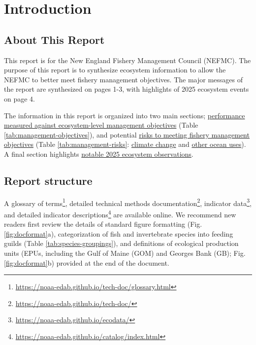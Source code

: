 \documentclass[
  10pt,
]{article}
\author{}
\date{\vspace{-2.5em}}
\begin{document}
\setcounter{page}{6}
\thispagestyle{fancy}

\section{Introduction}\label{introduction}

\subsection{About This Report}\label{about-this-report}

This report is for the New England Fishery Management Council (NEFMC). The purpose of this report is to synthesize ecosystem information to allow the NEFMC to better meet fishery management objectives. The major messages of the report are synthesized on pages 1-3, with highlights of 2025 ecosystem events on page 4.

The information in this report is organized into two main sections; \hyperref[performance-relative-to-fishery-management-objectives]{performance measured against ecosystem-level management objectives} (Table \ref{tab:management-objectives}), and potential \hyperref[risks-to-meeting-fishery-management-objectives]{risks to meeting fishery management objectives} (Table \ref{tab:management-risks}: \hyperref[climate-and-ecosystem-change]{climate change} and \hyperref[other-ocean-uses-offshore-wind]{other ocean uses}). A final section highlights \hyperref[highlights]{notable 2025 ecosystem observations}.

\subsection{Report structure}\label{report-structure}

A glossary of terms\footnote{\url{https://noaa-edab.github.io/tech-doc/glossary.html}}, detailed technical methods documentation\footnote{\url{https://noaa-edab.github.io/tech-doc/}}, indicator data\footnote{\url{https://noaa-edab.github.io/ecodata/}}, and detailed indicator descriptions\footnote{\url{https://noaa-edab.github.io/catalog/index.html}} are available online. We recommend new readers first review the details of standard figure formatting (Fig. \ref{fig:docformat}a), categorization of fish and invertebrate species into feeding guilds (Table \ref{tab:species-groupings}), and definitions of ecological production units (EPUs, including the Gulf of Maine (GOM) and Georges Bank (GB); Fig. \ref{fig:docformat}b) provided at the end of the document.
\end{document}

